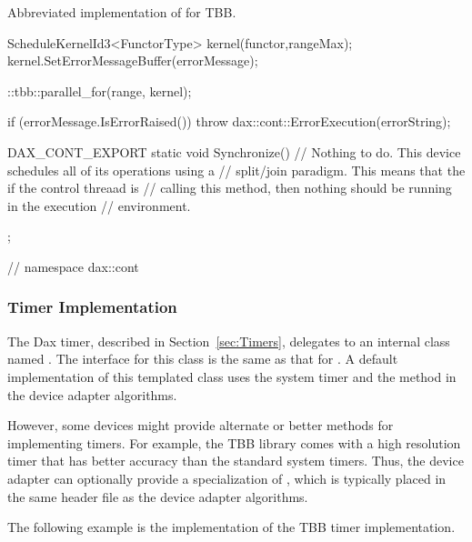 \begin{daxexample}{Abbreviated implementation of  for TBB.}
{{{{    ScheduleKernelId3<FunctorType> kernel(functor,rangeMax);
    kernel.SetErrorMessageBuffer(errorMessage);

    ::tbb::parallel_for(range, kernel);

    if (errorMessage.IsErrorRaised())
      {
      throw dax::cont::ErrorExecution(errorString);
      }
  }

  DAX_CONT_EXPORT static void Synchronize()
  {
    // Nothing to do. This device schedules all of its operations using a
    // split/join paradigm. This means that the if the control threaad is
    // calling this method, then nothing should be running in the execution
    // environment.
  }

};

}
} // namespace dax::cont
\end{daxexample}


\subsubsection{Timer Implementation}

The Dax timer, described in Section~\ref{sec:Timers}, delegates to an
internal class named . The
interface for this class is the same as that for . A default
implementation of this templated class uses the system timer and the
 method in the device adapter algorithms.

However, some devices might provide alternate or better methods for
implementing timers. For example, the TBB library comes with a high
resolution timer that has better accuracy than the standard system
timers. Thus, the device adapter can optionally provide a specialization of
, which is typically
placed in the same header file as the device adapter algorithms.

The following example is the implementation of the TBB timer
implementation.

